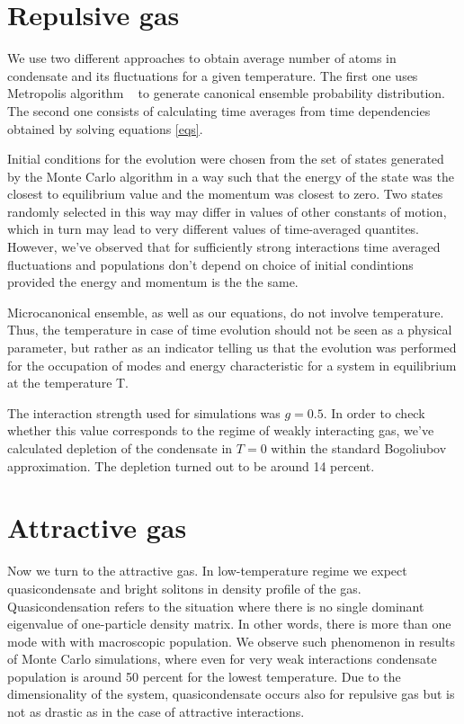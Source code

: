 \documentclass[aps,pra,reprint]{revtex4-2}
\begin{document}
\section{Repulsive gas}
    We use two different approaches to obtain average number of atoms in condensate and its fluctuations for a given temperature. The first one uses Metropolis algorithm ~\cite{metropolis1953equation} to generate canonical ensemble probability distribution. The second one consists of calculating time averages from time dependencies obtained by solving equations \ref{eqs}.
    
     Initial conditions for the evolution were chosen from the set of states generated by the Monte Carlo algorithm in a way such that the energy of the state was the closest to equilibrium value and the momentum was closest to zero. Two states randomly selected in this way may differ in values of other constants of motion, which in turn may lead to very different values of time-averaged quantites. However, we've observed that for sufficiently strong interactions time averaged fluctuations and populations don't depend on choice of initial condintions provided the energy and momentum is the the same.
     
    Microcanonical ensemble, as well as our equations, do not involve temperature.
    Thus, the temperature in case of time evolution should not be seen as a physical parameter, but rather as an indicator telling us that the evolution was performed for the  occupation of modes and energy characteristic for a system in equilibrium at the temperature T.
    
    The interaction strength used for simulations was $g=0.5$. In order to check whether this value corresponds to the regime of weakly interacting gas, we've calculated depletion of the condensate in $T=0$ within the standard Bogoliubov approximation. The depletion turned out to be around 14 percent.

\section{Attractive gas}
   Now we turn to the attractive gas. In low-temperature regime we expect quasicondensate and bright solitons in density profile of the gas. Quasicondensation refers to the situation where there is no single dominant eigenvalue of one-particle density matrix. In other words, there is more than one mode with with macroscopic population. We observe such phenomenon in results of Monte Carlo simulations, where even for very weak interactions condensate population is around 50 percent for the lowest temperature. Due to the dimensionality of the system, quasicondensate occurs also for repulsive gas but is not as drastic as in the case of attractive interactions.
\end{document}
